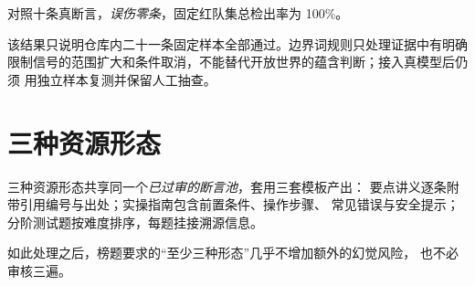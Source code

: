 对照十条真断言，\emph{误伤零条}，固定红队集总检出率为 100\%。

该结果只说明仓库内二十一条固定样本全部通过。边界词规则只处理证据中有明确
限制信号的范围扩大和条件取消，不能替代开放世界的蕴含判断；接入真模型后仍须
用独立样本复测并保留人工抽查。

\section{三种资源形态}

三种资源形态共享同一个\emph{已过审的断言池}，套用三套模板产出：
要点讲义逐条附带引用编号与出处；实操指南包含前置条件、操作步骤、
常见错误与安全提示；分阶测试题按难度排序，每题挂接溯源信息。

如此处理之后，榜题要求的“至少三种形态”几乎不增加额外的幻觉风险，
也不必审核三遍。



